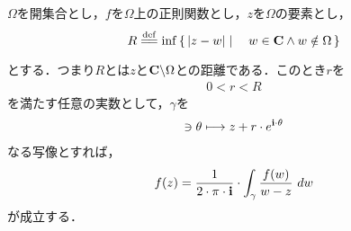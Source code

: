 	\begin{screen}
		\begin{thm}[円周上の積分公式]
			$\Omega$を開集合とし，$f$を$\Omega$上の正則関数とし，$z$を$\Omega$の要素とし，
			\begin{align}
				R \defeq \inf{}{\Set{|z-w|}{w \in \C \wedge w \notin \Omega}}
			\end{align}
			とする．つまり$R$とは$z$と$\mathbf{C} \backslash \Omega$との距離である．このとき$r$を
			\begin{align}
				0 < r < R
			\end{align}
			を満たす任意の実数として，$\gamma$を
			\begin{align}
				[0,2 \cdot \pi] \ni \theta \longmapsto z + r \cdot e^{\isym \cdot \theta}
			\end{align}
			なる写像とすれば，
			\begin{align}
				f(z) = \frac{1}{2 \cdot \pi \cdot \mathbf{i}} \cdot \int_{\gamma} \frac{f(w)}{w - z}\ dw
			\end{align}
			が成立する．
		\end{thm}
	\end{screen}
	
